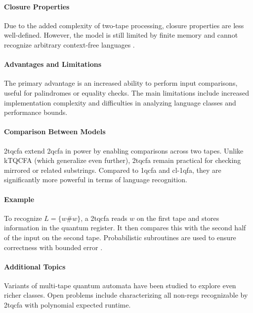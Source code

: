 \paragraph{Closure Properties}  
Due to the added complexity of two-tape processing, closure properties are less well-defined. However, the model is still limited by finite memory and cannot recognize arbitrary context-free languages \cite{li2015hybrid}.

\paragraph{Advantages and Limitations}  
The primary advantage is an increased ability to perform input comparisons, useful for palindromes or equality checks. The main limitations include increased implementation complexity and difficulties in analyzing language classes and performance bounds.

\paragraph{Comparison Between Models}  
\gls{2tqcfa} extend \gls{2qcfa} in power by enabling comparisons across two tapes. Unlike kTQCFA (which generalize even further), \gls{2tqcfa} remain practical for checking mirrored or related substrings. Compared to \gls{1qcfa} and \gls{cl-1qfa}, they are significantly more powerful in terms of language recognition.

\paragraph{Example}  
To recognize $L = \{ w \# w \}$, a \gls{2tqcfa} reads $w$ on the first tape and stores information in the quantum register. It then compares this with the second half of the input on the second tape. Probabilistic subroutines are used to ensure correctness with bounded error \cite{zheng2011two}.

\paragraph{Additional Topics}  
Variants of multi-tape quantum automata have been studied to explore even richer classes. Open problems include characterizing all non-\glspl{reg} recognizable by \gls{2tqcfa} with polynomial expected runtime.


\subsubsection{}

